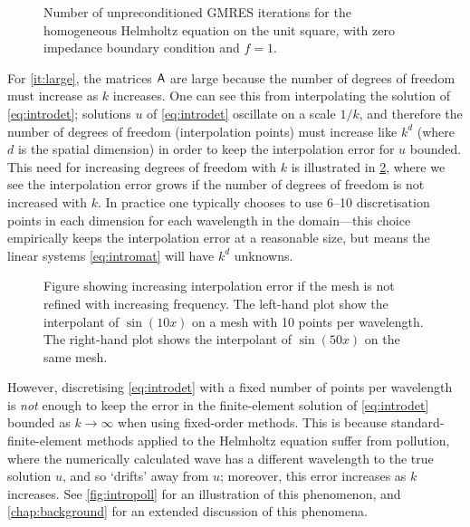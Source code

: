        \begin{figure}[h]
      \centering
      
      \caption{Number of unpreconditioned GMRES iterations for the homogeneous Helmholtz equation on the unit square, with zero impedance boundary condition and $f=1$.\label{fig:GMRES}}
      \end{figure}
    
    For \cref{it:large}, the matrices $\mathsf{A}$ are large because the number of degrees of freedom must increase as $k$ increases. One can see this from interpolating the solution of \eqref{eq:introdet}; solutions $u$ of \eqref{eq:introdet} oscillate on a scale $1/k$, and therefore the number of degrees of freedom (interpolation points) must increase like $k^d$ (where $d$ is the spatial dimension) in order to keep the interpolation error for $u$ bounded. This need for increasing degrees of freedom with $k$ is illustrated in \cref{fig:introinterp}, where we see the interpolation error grows if the number of degrees of freedom is not increased with $k$. In practice one typically chooses to use 6--10 discretisation points in each dimension for each wavelength in the domain---this choice  empirically keeps the interpolation error at a reasonable size, but means the linear systems \eqref{eq:intromat} will have $k^d$ unknowns.

\begin{figure}[h]
    \centering
  \begin{subfigure}{0.45\textwidth}

  \end{subfigure}
    \begin{subfigure}{0.45\textwidth}

    \end{subfigure}
\caption{\label{fig:introinterp} Figure showing increasing interpolation error if the mesh is not refined with increasing frequency. The left-hand plot show the interpolant of $\sin(10x)$ on a mesh with 10 points per wavelength. The right-hand plot shows the interpolant of $\sin(50x)$ on the same mesh.}
\end{figure}
However, discretising \eqref{eq:introdet} with a fixed number of points per wavelength is \emph{not} enough to keep the error in the finite-element solution of \eqref{eq:introdet} bounded as $k\rightarrow \infty$ when using fixed-order methods. This is because standard-finite-element methods applied to the Helmholtz equation suffer from pollution, where the numerically calculated wave has a different wavelength to the true solution $u$, and so `drifts' away from $u$; moreover, this error increases as $k$ increases. See \cref{fig:intropoll} for an illustration of this phenomenon, and \cref{chap:background} for an extended discussion of this phenomena.

